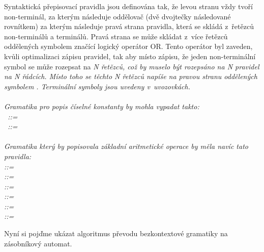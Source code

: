 Syntaktická přepisovací pravidla jsou definována tak, že levou stranu vždy tvoří non-terminál, za kterým následuje oddělovač \uv{::=} (dvě dvojtečky následované rovnítkem) za kterým následuje pravá strana pravidla, která se skládá z~řetězců non-terminálů a terminálů. Pravá strana se může skládat z~více řetězců oddělených symbolem \uv{\textbar} značící logický operátor OR. Tento operátor byl zaveden, kvůli optimalizaci zápisu pravidel, tak aby místo zápisu, že jeden non-terminální symbol se může rozepsat na \it{N} řetězců, což by muselo být rozepsáno na \it{N} pravidel na \it{N} řádcích. Místo toho se těchto \it{N} řetězců napíše na pravou stranu oddělených symbolem \uv{\textbar}. Terminální symboly jsou uvedeny v~uvozovkách.
\cite{BCF}
\\
\\
Gramatika pro popis číselné konstanty by mohla vypadat takto:\\
~::= ~\textbar~  \\
~::=~~\textbar~~\textbar~~\textbar~~\textbar~~
\textbar~~\textbar~~\textbar~~\textbar~~\textbar~ \\
\\
Gramatika který by popisovala základní aritmetické operace by měla navíc tato pravidla:\\
 ::=  \uv{+}  \\
 ::=  \uv{-}  \\
 ::=  \uv{\(\times\)}  \\
 ::=  \uv{/}  \\
 ::= \uv{(}  \uv{)} \\
 ::= \\


Nyní si pojďme ukázat algoritmus převodu bezkontextové gramatiky na zásobníkový automat. \cite{CFG_to_PDA}

